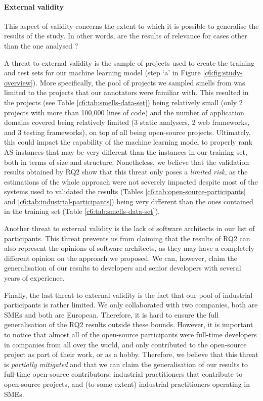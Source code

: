 \paragraph*{External validity}
This aspect of validity concerns the extent to which it is possible to generalise the results of the study. In other words, are the results of relevance for cases other than the one analysed \cite{Runeson2012}?

A threat to external validity is the sample of projects used to create the training and test sets for our machine learning model (step `a' in Figure \ref{c6:fig:study-overview}).
More specifically, the pool of projects we sampled smells from was limited to the projects that our annotators were familiar with. This resulted in the projects (see Table \ref{c6:tab:smells-data-set}) being relatively small (only 2 projects with more than 100,000 lines of code) and the number of application domains covered being relatively limited (3 static analysers, 2 web frameworks, and 3 testing frameworks), on top of all being open-source projects.
Ultimately, this could impact the capability of the machine learning model to properly rank AS instances that may be very different than the instances in our training set, both in terms of size and structure.
Nonetheless, we believe that the validation results obtained by RQ2 show that this threat only poses a \emph{limited risk}, as the estimations of the whole approach were not severely impacted despite most of the systems used to validated the results (Tables \ref{c6:tab:open-source-participants} and \ref{c6:tab:industrial-participants}) being very different than the ones contained in the training set (Table \ref{c6:tab:smells-data-set}).

Another threat to external validity is the lack of software architects in our list of participants.
This threat prevents us from claiming that the results of RQ2 can also represent the opinions of software architects, as they may have a completely different opinion on the approach we proposed.
We can, however, claim the generalisation of our results to developers and senior developers with several years of experience.

Finally, the last threat to external validity is the fact that our pool of industrial participants is rather limited. 
We only collaborated with two companies, both are SMEs and both are European.
Therefore, it is hard to ensure the full generalisation of the RQ2 results outside these bounds.
However, it is important to notice that almost all of the open-source participants were full-time developers in companies from all over the world, and only contributed to the open-source project as part of their work, or as a hobby.
Therefore, we believe that this threat is \emph{partially mitigated} and that we can claim the generalisation of our results to full-time open-source contributors, industrial practitioners that contribute to open-source projects, and (to some extent) industrial practitioners operating in SMEs.

